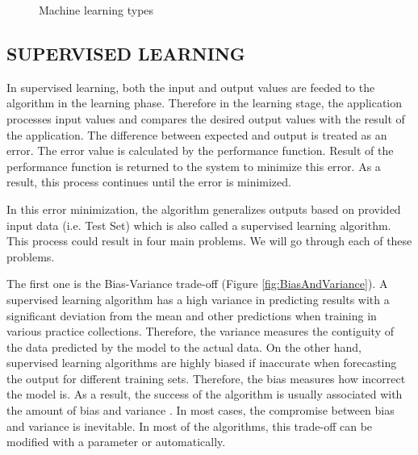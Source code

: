 \begin{figure}[htbp]
\centering
{}
\caption{Machine learning types}
\label{fig:MachineLearningTypes}
\end{figure}

\subsection{SUPERVISED LEARNING}

In supervised learning, both the input and output values are feeded to the algorithm in the learning phase. Therefore in the learning stage, the application processes input values and compares the desired output values with the result of the application. The difference between expected and output is treated as an error. The error value is calculated by the performance function. Result of the performance function is returned to the system to minimize this error. As a result, this process continues until the error is minimized.

In this error minimization, the algorithm generalizes outputs based on provided input data (i.e. Test Set) which is also called a supervised learning algorithm. This process could result in four main problems. We will go through each of these problems. 

The first one is the Bias-Variance trade-off \cite{geman1992neural} (Figure \ref{fig:BiasAndVariance}). A supervised learning algorithm has a high variance in predicting results with a significant deviation from the mean and other predictions when training in various practice collections. Therefore, the variance measures the contiguity of the data predicted by the model to the actual data. On the other hand, supervised learning algorithms are highly biased if inaccurate when forecasting the output for different training sets. Therefore, the bias measures how incorrect the model is. As a result, the success of the algorithm is usually associated with the amount of bias and variance \cite{james2003variance}. In most cases, the compromise between bias and variance is inevitable. In most of the algorithms, this trade-off can be modified with a parameter or automatically. 

